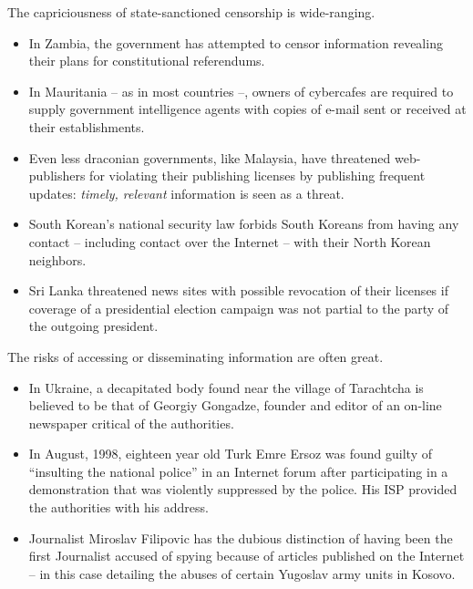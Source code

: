 \documentclass[letterpaper,12pt,english]{sphinxmanual}
\begin{document}
The capriciousness of state-sanctioned censorship is wide-ranging.
\begin{itemize}
\item {} 
In Zambia, the government has attempted to censor information revealing their plans for constitutional referendums.

\item {} 
In Mauritania -- as in most countries --, owners of cybercafes are required to supply government intelligence agents with copies of e-mail sent or received at their establishments.

\item {} 
Even less draconian governments, like Malaysia, have threatened web-publishers for violating their publishing licenses by publishing frequent updates: \emph{timely, relevant} information is seen as a threat.

\item {} 
South Korean's national security law forbids South Koreans from having any contact -- including contact over the Internet -- with their North Korean neighbors.

\item {} 
Sri Lanka threatened news sites with possible revocation of their licenses if coverage of a presidential election campaign was not partial to the party of the outgoing president.

\end{itemize}

The risks of accessing or disseminating information are often great.
\begin{itemize}
\item {} 
In Ukraine, a decapitated body found near the village of Tarachtcha is believed to be that of Georgiy Gongadze, founder and editor of an on-line newspaper critical of the authorities.

\item {} 
In August, 1998, eighteen year old Turk Emre Ersoz was found guilty of ``insulting the national police'' in an Internet forum after participating in a demonstration that was violently suppressed by the police.  His ISP provided the authorities with his address.

\item {} 
Journalist Miroslav Filipovic has the dubious distinction of having been the first Journalist accused of spying because of articles published on the Internet -- in this case detailing the abuses of certain Yugoslav army units in Kosovo.

\end{itemize}
\end{document}
